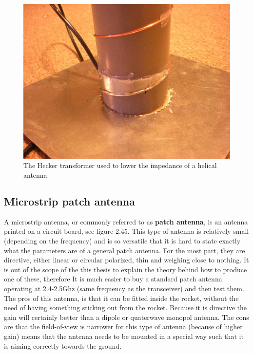 \begin{figure}[h]
\centering
\includegraphics[scale=0.8]{figures/FormerHelical.jpg}
\caption{The Hecker transformer used to lower the impedance of a helical antenna}
\end{figure}

\subsection{Microstrip patch antenna}
A microstrip antenna, or commonly referred to as \textbf{patch antenna}, is an antenna printed on a circuit board, see figure 2.45. This type of antenna is relatively small (depending on the frequency) and is so versatile that it is hard to state exactly what the parameters are of a general patch antenna. For the most part, they are directive, either linear or circular polarized, thin and weighing close to nothing. It is out of the scope of the this thesis to explain the theory behind how to produce one of these, therefore It is much easier to buy a standard patch antenna operating at 2.4-2.5Ghz (same frequency as the transceiver) and then test them. The pros of this antenna, is that it can be fitted inside the rocket, without the need of having something sticking out from the rocket. Because it is directive the gain will certainly better than a dipole or quaterwave monopol antenna. The cons are that the field-of-view is narrower for this type of antenna (because of higher gain) means that the antenna needs to be mounted in a special way such that it is aiming correctly towards the ground.  

